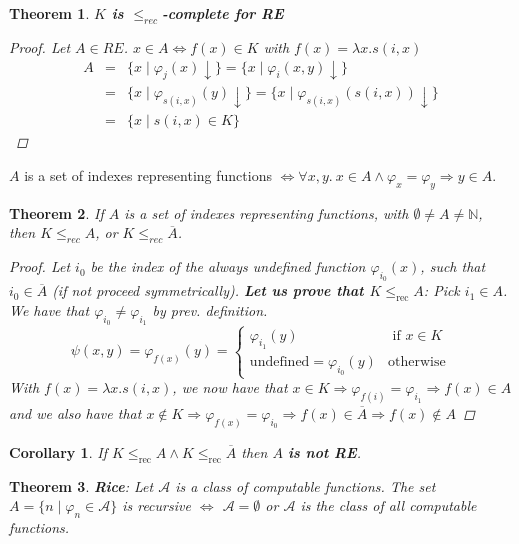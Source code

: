 \documentclass[10pt,landscape]{article}
\newcommand{\impl}{\Rightarrow}
\newcommand{\conv}{\downarrow}
\newcommand{\N}{\mathbb{N}}
\newcommand{\undef}{\text{undefined}}
\newcommand{\red}[1]{\leqslant_{#1}}
\renewcommand{\iff}{\Leftrightarrow}
\theoremstyle{plain}%
\newtheorem*{thm}{Theorem}
\newtheorem*{cor}{Corollary}
\theoremstyle{definition}
\theoremstyle{remark}
\begin{document}
\begin{multicols}{4}
\begin{thm}
    \textbf{$K$ is $\red{rec}$-complete for RE}
    \begin{proof}
        Let $A \in RE$.
        $x \in A \iff f(x) \in K$ with $f(x) = \lambda x. s(i, x)$
        \begin{eqnarray*}
            A &=& \{ x \mid \varphi_j(x) \conv \} = \{ x \mid \varphi_i(x, y) \conv \} \\
            &=& \{ x \mid \varphi_{s(i,x)}(y) \conv \} = \{ x \mid \varphi_{s(i,x)}(s(i,x)) \conv \} \\
            &=& \{ x \mid s(i,x) \in K \}
        \end{eqnarray*}
    \end{proof}
\end{thm}

$A$ is a set of indexes representing functions $\iff \forall x,y . \ x \in A \wedge \varphi_x = \varphi_y \impl y \in A$.


\begin{thm}
    If $A$ is a set of indexes representing functions, with $\emptyset \neq A \neq \N$, then $K \red{rec} A$, or $K \red{rec} \overline{A}$.

    \begin{proof}
        Let $i_0$ be the index of the \textit{always undefined} function $\varphi_{i_0}(x)$, such that 
        $i_0 \in \overline{A}$ (if not proceed symmetrically). \textbf{Let us prove that $K \red{\text{rec}} A$}:
        Pick $i_1 \in A$. We have that $\varphi_{i_0} \neq \varphi_{i_1}$ by prev. definition.
        \[\psi(x,y) = \varphi_{f(x)}(y) = \begin{cases}
            \varphi_{i_1}(y) & \text{ if } x \in K \\ 
            \undef = \varphi_{i_0}(y) & \text{otherwise}
        \end{cases}\]
        With $f(x) = \lambda x . s(i, x)$, we now have that $x \in K \impl \varphi_{f(i)} = \varphi_{i_1} \impl f(x) \in A$ and we also have that
        $x \notin K \impl \varphi_{f(x)} = \varphi_{i_0} \impl f(x) \in \overline{A} \impl f(x) \notin A$
    \end{proof}
\end{thm}


\begin{cor}
    If $K \red{\text{rec}} A \wedge K \red{\text{rec}} \overline{A}$ then $A$ \textbf{is not RE}.
\end{cor}

\begin{thm}
    \textbf{Rice}: Let $\mathcal{A}$ is a class of computable functions.
    The set $A = \{n \mid \varphi_n \in \mathcal{A}\}$ is recursive $\iff$ 
    $\mathcal{A} = \emptyset$ or $\mathcal{A}$ is the class of all computable functions.


\end{thm}
\end{multicols}
\end{document}
